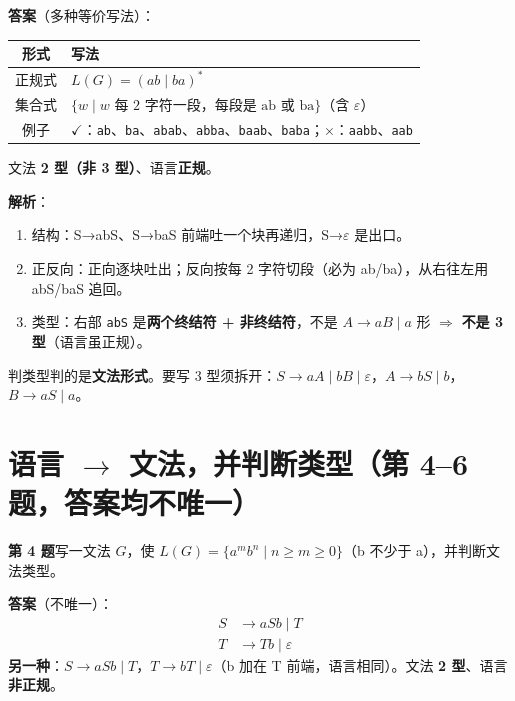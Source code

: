 \documentclass[12pt,a4paper,fontset=windows]{ctexart}
\newcommand{\ok}{\ensuremath{\checkmark}}
\newcommand{\bad}{\ensuremath{\times}}
\newcommand{\imp}{\ensuremath{\Rightarrow}}
\begin{document}
\textbf{答案}（多种等价写法）：

\begin{center}
\renewcommand{\arraystretch}{1.25}
\begin{tabular}{c p{11.2cm}}
\toprule
\textbf{形式} & \textbf{写法} \\
\midrule
正规式 & $L(G)=(ab \mid ba)^*$ \\
集合式 & $\{w \mid w \text{ 每 2 字符一段，每段是 ab 或 ba}\}$（含 $\varepsilon$） \\
例子 & \ok：\texttt{ab}、\texttt{ba}、\texttt{abab}、\texttt{abba}、\texttt{baab}、\texttt{baba}；\bad：\texttt{aabb}、\texttt{aab} \\
\bottomrule
\end{tabular}
\end{center}

文法 \textbf{2 型（非 3 型）}、语言\textbf{正规}。

\textbf{解析}：
\begin{enumerate}
\item 结构：S→abS、S→baS 前端吐一个块再递归，S→$\varepsilon$ 是出口。
\item 正反向：正向逐块吐出；反向按每 2 字符切段（必为 ab/ba），从右往左用 abS/baS 追回。
\item 类型：右部 \texttt{abS} 是\textbf{两个终结符 + 非终结符}，不是 $A \to aB \mid a$ 形 \imp{} \textbf{不是 3 型}（语言虽正规）。
\end{enumerate}

\begin{warnbox}[语言正规 $\ne$ 文法 3 型]
判类型判的是\textbf{文法形式}。要写 3 型须拆开：$S \to aA \mid bB \mid \varepsilon$，$A \to bS \mid b$，$B \to aS \mid a$。
\end{warnbox}

\section{\texorpdfstring{语言 $\to$ 文法，并判断类型（第 4--6 题，答案均不唯一）}{语言→文法，并判断类型（第 4–6 题，答案均不唯一）}}

\begin{qbox}
{\large\bfseries 第 4 题}\quad 写一文法 $G$，使 $L(G)=\{a^m b^n \mid n \ge m \ge 0\}$（b 不少于 a），并判断文法类型。
\end{qbox}

\textbf{答案}（不唯一）：
\[
\begin{aligned}
S &\to aSb \mid T\\
T &\to Tb \mid \varepsilon
\end{aligned}
\]
\textbf{另一种}：$S \to aSb \mid T$，$T \to bT \mid \varepsilon$（b 加在 T 前端，语言相同）。文法 \textbf{2 型}、语言\textbf{非正规}。
\end{document}
